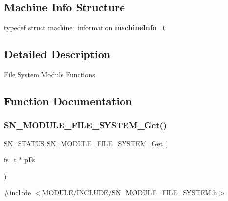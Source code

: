 \subsection*{Machine Info Structure}
\begin{DoxyCompactItemize}
\item 
\mbox{\label{group__MODULE__FILE__SYSTEM_ga1bae7007ff8bd7779a5b0a69c24013b9}} 
typedef struct \hyperlink{structmachine__information}{machine\+\_\+information} {\bfseries machine\+Info\+\_\+t}
\end{DoxyCompactItemize}


\subsection{Detailed Description}
File System Module Functions. 



\subsection{Function Documentation}
\mbox{\label{group__MODULE__FILE__SYSTEM_gadfe4c4eeb9c662e30893824357bc46a5}} 
\subsubsection{\texorpdfstring{S\+N\+\_\+\+M\+O\+D\+U\+L\+E\+\_\+\+F\+I\+L\+E\+\_\+\+S\+Y\+S\+T\+E\+M\+\_\+\+Get()}{SN\_MODULE\_FILE\_SYSTEM\_Get()}}
{\footnotesize\ttfamily \hyperlink{group__SYSTEM__ERROR_ga4540713b9a7a18ce44d78c3a10f7442f}{S\+N\+\_\+\+S\+T\+A\+T\+US} S\+N\+\_\+\+M\+O\+D\+U\+L\+E\+\_\+\+F\+I\+L\+E\+\_\+\+S\+Y\+S\+T\+E\+M\+\_\+\+Get (\begin{DoxyParamCaption}\item[{\hyperlink{structfile__system}{fs\+\_\+t} $\ast$}]{p\+Fs }\end{DoxyParamCaption})}



{\ttfamily \#include $<$\hyperlink{SN__MODULE__FILE__SYSTEM_8h}{M\+O\+D\+U\+L\+E/\+I\+N\+C\+L\+U\+D\+E/\+S\+N\+\_\+\+M\+O\+D\+U\+L\+E\+\_\+\+F\+I\+L\+E\+\_\+\+S\+Y\+S\+T\+E\+M.\+h}$>$}


